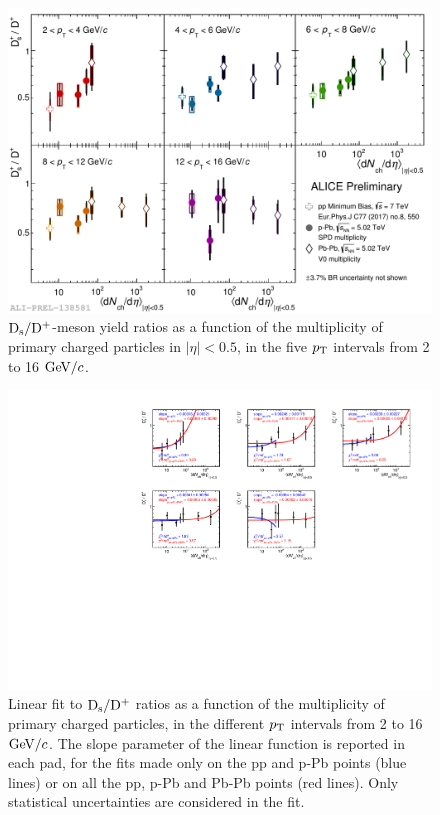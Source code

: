 \begin{figure}[h!]
    \begin{center}
          \includegraphics[width=1\textwidth]{./FigCap6/DsOverDplusVsMult_pp_pPb_PbPb.pdf}
    \end{center}
    \caption{ ${\rm D_s}/{\rm D^+}$-meson yield ratios as a function of the multiplicity of primary charged particles in $|\eta|<0.5$, in the five $p_{\rm T}$ intervals from 2 to 16 $\mathrm{GeV}/c$.}
    \label{fig:DsDplusRatios}
\end{figure}

\begin{figure}[h!]
    \begin{center}
          \includegraphics[width=1.1\textwidth]{./FigCap6/Fit_DsOverDplusVsMult_pp7TeV_pPb5TeV_PbPb5TeV.pdf}
    \end{center}
    \caption{Linear fit to ${\rm D_s}/{\rm D^+}$ ratios as a function of the multiplicity of primary charged particles, in the different $p_{\rm T}$ intervals from 2 to 16 $\mathrm{GeV}/c$. The slope parameter of the linear function is reported in each pad, for the fits made only on the pp and p-Pb points (blue lines) or on
    all the pp, p-Pb and Pb-Pb points (red lines). Only statistical uncertainties are considered in the fit.}
    \label{fig:FitRatios}
\end{figure}


